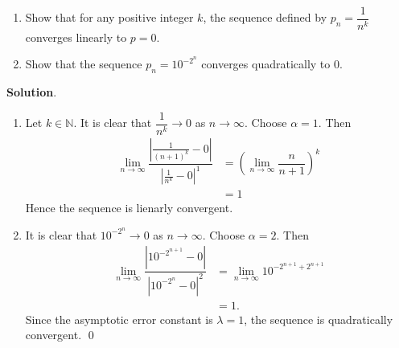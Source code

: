 \documentclass[11pt]{article}
\theoremstyle{break}
\numberwithin{equation}{theorem}
\begin{document}
\newpage
\begin{problem}\label{problem 9}$\ $
    \begin{enumerate}
        \item Show that for any positive integer $k$, the sequence defined by $p_n=\dfrac{1}{n^k}$ converges linearly to $p=0$.
        \item Show that the sequence $p_n=10^{-2^n}$ converges quadratically to $0$.
    \end{enumerate}
\end{problem}
\textbf{Solution}.
\begin{enumerate}
    \item Let $k\in\mathbb{N}$. It is clear that $\dfrac{1}{n^k}\to0$ as $n\to\infty$. Choose $\alpha=1$. Then
    \begin{align*}
        \lim_{n\to\infty}\dfrac{\left\lvert\frac{1}{(n+1)^k}-0\right\rvert}{\left\lvert\frac{1}{n^k}-0\right\rvert^1}&=\left(\lim_{n\to\infty}\dfrac{n}{n+1}\right)^k\\
        &=1
    \end{align*}
    Hence the sequence is lienarly convergent.
    \item It is clear that $10^{-2^n}\to0$ as $n\to\infty$. Choose $\alpha=2$. Then
    \begin{align*}
        \lim_{n\to\infty}\dfrac{\left\lvert10^{-2^{n+1}}-0\right\rvert}{\left\lvert10^{-2^n}-0\right\rvert^2}&=\lim_{n\to\infty}10^{-2^{n+1}+2^{n+1}}\\
        &=1.
    \end{align*}
    Since the asymptotic error constant is $\lambda=1$, the sequence is quadratically convergent. \qed
\end{enumerate}
\end{document}
